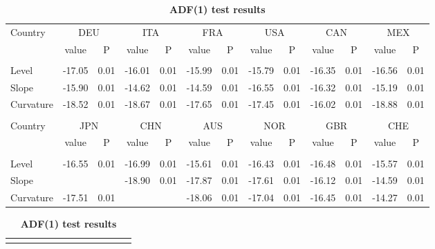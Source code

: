 \documentclass[12pt,bibliography=totoc]{article}
\begin{document}
\begin{appendices}
\begin{table}
\begin{subtable}[t]{1\textwidth}
\begin{tabular}{l cc cc cc cc cc cc}
Country	&	\multicolumn{2}{c}{DEU}			&	\multicolumn{2}{c}{ITA}			&	\multicolumn{2}{c}{FRA}			&	\multicolumn{2}{c}{USA}			&	\multicolumn{2}{c}{CAN}			&	\multicolumn{2}{c}{MEX}			\\[0.5ex] 

 & value &P & value &P& value &P & value &P& value &P & value &P\\

\hline       \\ [-1.5ex] 

Level	&	-17.05	&	0.01	&	-16.01	&	0.01	&	-15.99	&	0.01	&	-15.79	&	0.01	&	-16.35	&	0.01	&	-16.56	&	0.01	\\
Slope	&	-15.90	&	0.01	&	-14.62	&	0.01	&	-14.59	&	0.01	&	-16.55	&	0.01	&	-16.32	&	0.01	&	-15.19	&	0.01	\\
\medskip
Curvature	&-18.52	&	0.01	&	-18.67	&	0.01	&	-17.65	&	0.01	&	-17.45	&	0.01	&	-16.02	&	0.01	&	-18.88	&	0.01	\\


\hline   \\ [-1.5ex]    

Country	&	\multicolumn{2}{c}{JPN}			&	\multicolumn{2}{c}{CHN}			&	\multicolumn{2}{c}{AUS}			&	\multicolumn{2}{c}{NOR}			&	\multicolumn{2}{c}{GBR}			&	\multicolumn{2}{c}{CHE}			\\

 & value &P & value &P& value &P & value &P& value &P & value &P\\

\hline       \\ [-1.5ex] 

Level	&	-16.55	&	0.01	&	-16.99	&	0.01	&	-15.61	&	0.01	&	-16.43	&	0.01	&	-16.48	&	0.01	&	-15.57	&	0.01	\\
Slope	&		&		&	-18.90	&	0.01	&	-17.87	&	0.01	&	-17.61	&	0.01	&	-16.12	&	0.01	&	-14.59	&	0.01	\\
\medskip
Curvature	&	-17.51	&	0.01	&		&		&	-18.06	&	0.01	&	-17.04	&	0.01	&	-16.45	&	0.01	&	-14.27	&	0.01	\\



\hline
\end{tabular}
\caption{\textbf{ADF(1) test results}}
\end{subtable}
\hspace{\fill}
\bigskip 

\begin{subtable}[t]{1\textwidth}
\centering
\begin{tabular}{l cc cc cc cc cc cc}%
\hline\hline \\ [-1.5ex]                         %


\end{tabular}
\end{subtable}
\end{table}
\end{appendices}
\end{document}
